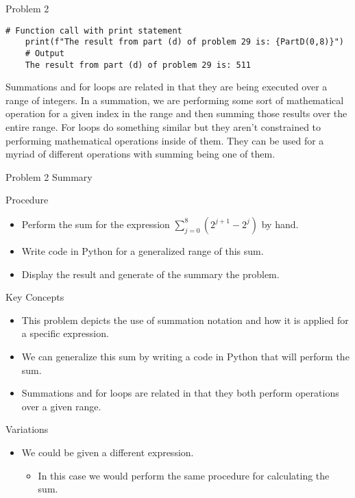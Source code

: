 \begin{problem}{Problem 2}
\begin{Highlight}[Solution - \#29]
    \begin{lstlisting}[style=stackoverflow]
    # Function call with print statement
    print(f"The result from part (d) of problem 29 is: {PartD(0,8)}")
    # Output
    The result from part (d) of problem 29 is: 511
    \end{lstlisting}

        Summations and for loops are related in that they are being executed over a range of integers. In a summation, we are performing some sort of mathematical operation for a given index in the 
        range and then summing those results over the entire range. For loops do something similar but they aren't constrained to performing mathematical operations inside of them. They can be used
        for a myriad of different operations with summing being one of them.
    \end{Highlight}
\end{problem}

\begin{summary}{Problem 2 Summary}
    \begin{statement}{Procedure}
        \begin{itemize}
            \item Perform the sum for the expression $\sum_{j = 0}^{8}(2^{j + 1} - 2^{j})$ by hand.
            \item Write code in Python for a generalized range of this sum.
            \item Display the result and generate of the summary the problem.
        \end{itemize}
    \end{statement}
    \begin{statement}{Key Concepts}
        \begin{itemize}
            \item This problem depicts the use of summation notation and how it is applied for a specific expression.
            \item We can generalize this sum by writing a code in Python that will perform the sum.
            \item Summations and for loops are related in that they both perform operations over a given range.
        \end{itemize}
    \end{statement}
    \begin{statement}{Variations}
        \begin{itemize}
            \item We could be given a different expression.
            \begin{itemize}
                \item In this case we would perform the same procedure for calculating the sum.
            \end{itemize}
        \end{itemize}
    \end{statement}
\end{summary}

